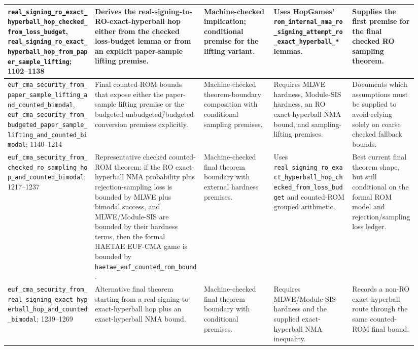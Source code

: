 \documentclass[11pt]{report}
\DeclareRobustCommand{\ec}[1]{\ifmmode\text{\nolinkurl{#1}}\else\nolinkurl{#1}\fi}
\theoremstyle{definition}
\theoremstyle{plain}
\begin{document}
{\begin{longtable}{p{0.20\linewidth}p{0.25\linewidth}p{0.16\linewidth}p{0.18\linewidth}p{0.15\linewidth}}
\midrule
\ec{real\_signing\_ro\_exact\_hyperball\_hop\_checked\_from\_loss\_budget},
\ec{real\_signing\_ro\_exact\_hyperball\_hop\_from\_paper\_sample\_lifting};
1102--1138 &
Derives the real-signing-to-RO-exact-hyperball hop either from the checked
loss-budget lemma or from an explicit paper-sample lifting premise. &
Machine-checked implication; conditional premise for the lifting variant. &
Uses HopGames' \ec{rom\_internal\_nma\_ro\_signing\_attempt\_ro\_exact\_hyperball\_*}
lemmas. &
Supplies the first premise for the final checked RO sampling theorem. \\
\midrule
\ec{euf\_cma\_security\_from\_paper\_sample\_lifting\_and\_counted\_bimodal},
\ec{euf\_cma\_security\_from\_budgeted\_paper\_sample\_lifting\_and\_counted\_bimodal};
1140--1214 &
Final counted-ROM bounds that expose either the paper-sample lifting premise or
the budgeted unbudgeted/budgeted conversion premises explicitly. &
Machine-checked theorem-boundary composition with conditional sampling
premises. &
Requires MLWE hardness, Module-SIS hardness, an RO exact-hyperball NMA bound,
and sampling-lifting premises. &
Documents which assumptions must be supplied to avoid relying solely on coarse
checked fallback bounds. \\
\midrule
\ec{euf\_cma\_security\_from\_checked\_ro\_sampling\_hop\_and\_counted\_bimodal};
1217--1237 &
Representative checked counted-ROM theorem: if the RO exact-hyperball NMA
probability plus rejection-sampling loss is bounded by MLWE plus bimodal
success, and MLWE/Module-SIS are bounded by their hardness terms, then the
formal HAETAE EUF-CMA game is bounded by
\ec{haetae\_euf\_counted\_rom\_bound}. &
Machine-checked final theorem boundary with external hardness premises. &
Uses \ec{real\_signing\_ro\_exact\_hyperball\_hop\_checked\_from\_loss\_budget}
and counted-ROM grouped arithmetic. &
Best current final theorem shape, but still conditional on the formal ROM
model and rejection/sampling loss ledger. \\
\midrule
\ec{euf\_cma\_security\_from\_real\_signing\_exact\_hyperball\_hop\_and\_counted\_bimodal};
1239--1269 &
Alternative final theorem starting from a real-signing-to-exact-hyperball hop
plus an exact-hyperball NMA bound. &
Machine-checked final theorem boundary with conditional premises. &
Requires MLWE/Module-SIS hardness and the supplied exact-hyperball NMA
inequality. &
Records a non-RO exact-hyperball route through the same counted-ROM final
bound. \\
\bottomrule
\end{longtable}
}
\end{document}
